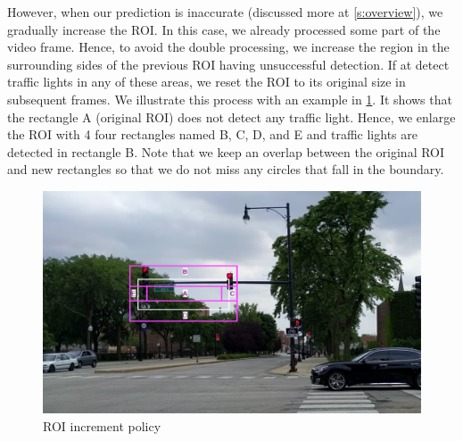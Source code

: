 However, when our prediction is inaccurate (discussed more at \ref{s:overview}), we gradually increase the ROI.
In this case, we already processed some part of the video frame. 
Hence, to avoid the double processing, we increase the region in the surrounding sides of the previous ROI having unsuccessful detection.
If at detect traffic lights in any of these areas, we reset the ROI to its original size in subsequent frames.
We illustrate this process with an example in \ref{f:rectangle}.
It shows that the rectangle A (original ROI) does not detect any traffic light.
Hence, we enlarge the ROI with 4 four rectangles named B, C, D, and E and traffic lights are detected in rectangle B.
Note that  we keep an overlap between the original ROI and new rectangles so that we do not miss any circles that fall in the boundary. 


\begin{figure}
\centering
\includegraphics[width=5.2in]{figures/rectangle.pdf}
\caption{ROI increment policy}
\label{f:rectangle}
\end{figure}

